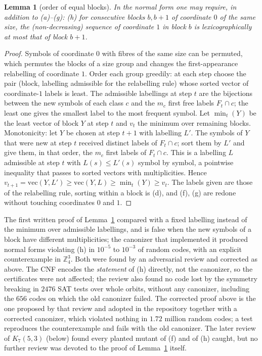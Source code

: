 \documentclass[11pt]{amsart}
\newtheorem{lemma}[theorem]{Lemma}
\theoremstyle{definition}
\theoremstyle{remark}
\begin{document}
\begin{lemma}[order of equal blocks]\label{lem:h}
In the normal form one may require, in addition to (a)--(g): (h) for consecutive blocks $b,b+1$ of coordinate $0$ of the same size, the (non-decreasing) sequence of coordinate $1$ in block $b$ is lexicographically at most that of block $b+1$.
\end{lemma}
\begin{proof}
Symbols of coordinate $0$ with fibres of the same size can be permuted, which permutes the blocks of a size group and changes the first-appearance relabelling of coordinate $1$. Order each group greedily: at each step choose the pair (block, labelling admissible for the relabelling rule) whose sorted vector of coordinate-$1$ labels is least. The admissible labellings at step $t$ are the bijections between the new symbols of each class $c$ and the $m_c$ first free labels $F_t\cap c$; the least one gives the smallest label to the most frequent symbol. Let $\min_t(Y)$ be the least vector of block $Y$ at step $t$ and $v_t$ the minimum over remaining blocks.
Monotonicity: let $Y$ be chosen at step $t+1$ with labelling $L'$. The symbols of $Y$ that were new at step $t$ received distinct labels of $F_t\cap c$; sort them by $L'$ and give them, in that order, the $m_c$ first labels of $F_t\cap c$. This is a labelling $L$ admissible at step $t$ with $L(s)\le L'(s)$ symbol by symbol, a pointwise inequality that passes to sorted vectors with multiplicities. Hence $v_{t+1}=\mathrm{vec}(Y,L')\ge\mathrm{vec}(Y,L)\ge\min_t(Y)\ge v_t$. The labels given are those of the relabelling rule, sorting within a block is (d), and (f), (g) are redone without touching coordinates $0$ and $1$.
\end{proof}
The first written proof of Lemma~\ref{lem:h} compared with a fixed labelling instead of the minimum over admissible labellings, and is false when the new symbols of a block have different multiplicities; the canonizer that implemented it produced normal forms violating (h) in $10^{-5}$ to $10^{-3}$ of random codes, with an explicit counterexample in $\mathbb{Z}_4^3$.
Both were found by an adversarial review and corrected as above.
The CNF encodes the \emph{statement} of (h) directly, not the canonizer, so the certificates were not affected; the review also found no code lost by the symmetry breaking in $2476$ SAT tests over whole orbits, without any canonizer, including the $656$ codes on which the old canonizer failed.
The corrected proof above is the one proposed by that review and adopted in the repository together with a corrected canonizer, which violated nothing in $1.72$ million random codes; a test reproduces the counterexample and fails with the old canonizer.
The later review of $K_7(5,3)$ (below) found every planted mutant of (f) and of (h) caught, but no further review was devoted to the proof of Lemma~\ref{lem:h} itself.
\end{document}
